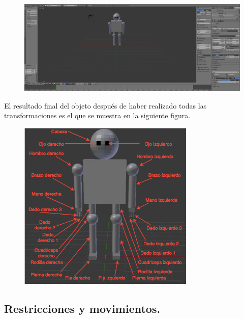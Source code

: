 \documentclass[10pt]{article}
\begin{document}
\begin{figure}[H]
	\begin{center}
	 		\includegraphics[width = 1.00\textwidth]{Imagenes/p2-img5.png}
	\end{center} 
\end{figure}

El resultado final del objeto después de haber realizado todas las transformaciones es el que se muestra en la siguiente figura.\\

\begin{figure}[H]
	\begin{center}
	 		\includegraphics[width = 0.75\textwidth]{Imagenes/p2-img17.png}
	\end{center} 
\end{figure}

\subsection{Restricciones y movimientos.}
\end{document}

